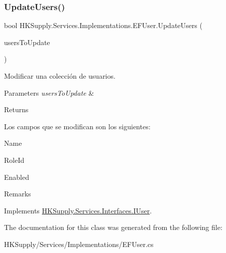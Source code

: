 \subsubsection{\texorpdfstring{Update\+Users()}{UpdateUsers()}}
{\footnotesize\ttfamily bool H\+K\+Supply.\+Services.\+Implementations.\+E\+F\+User.\+Update\+Users (\begin{DoxyParamCaption}\item[{I\+Enumerable$<$ \mbox{\hyperlink{class_h_k_supply_1_1_models_1_1_user}{User}} $>$}]{users\+To\+Update }\end{DoxyParamCaption})}



Modificar una colección de usuarios. 


\begin{DoxyParams}{Parameters}
{\em users\+To\+Update} & \\
\hline
\end{DoxyParams}
\begin{DoxyReturn}{Returns}

\end{DoxyReturn}


Los campos que se modifican son los siguientes\+:
\begin{DoxyItemize}
\item Name
\item Role\+Id
\item Enabled
\item Remarks 
\end{DoxyItemize}

Implements \mbox{\hyperlink{interface_h_k_supply_1_1_services_1_1_interfaces_1_1_i_user}{H\+K\+Supply.\+Services.\+Interfaces.\+I\+User}}.



The documentation for this class was generated from the following file\+:\begin{DoxyCompactItemize}
\item 
H\+K\+Supply/\+Services/\+Implementations/E\+F\+User.\+cs\end{DoxyCompactItemize}
